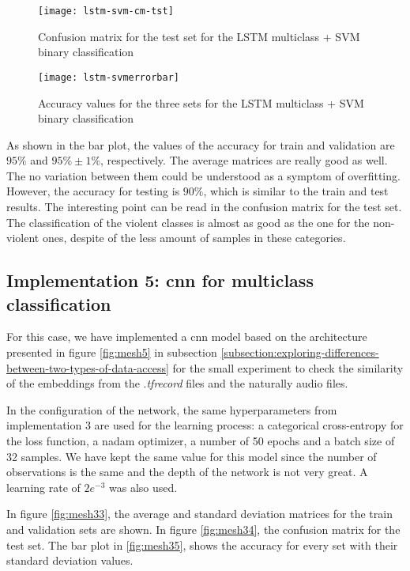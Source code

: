 	\begin{figure}[H]
		\centering
		\captionsetup{justification=centering}
		\texttt{[image: lstm-svm-cm-tst]}
		\caption{Confusion matrix for the test set for the LSTM multiclass + SVM binary classification}
		\label{fig:mesh31}
	\end{figure}
	
	\begin{figure}[H]
		\centering
		\captionsetup{justification=centering}
		\texttt{[image: lstm-svmerrorbar]}
		\caption{Accuracy values for the three sets for the LSTM multiclass + SVM binary classification}
		\label{fig:mesh32}
	\end{figure}

	As shown in the bar plot, the values of the accuracy for train and validation are $95\%$ and $95\% \pm 1\%$, respectively. The average matrices are really good as well. The no variation between them could be understood as a symptom of overfitting. However, the accuracy for testing is $90\%$, which is similar to the train and test results. The interesting point can be read in the confusion matrix for the test set. The classification of the violent classes is almost as good as the one for the non-violent ones, despite of the less amount of samples in these categories. 

	
\subsection{Implementation 5: \acrshort{cnn} for multiclass classification}

	For this case, we have implemented a \acrshort{cnn} model based on the architecture presented in figure \ref{fig:mesh5} in subsection \ref{subsection:exploring-differences-between-two-types-of-data-access} for the small experiment to check the similarity of the embeddings from the .\textit{tfrecord} files and the naturally audio files.
	
	In the configuration of the network, the same hyperparameters from implementation 3 are used for the learning process: a categorical cross-entropy for the loss function, a \acrshort{nadam} optimizer, a number of 50 epochs and a batch size of 32 samples. We have kept the same value for this model since the number of observations is the same and the depth of the network is not very great. A learning rate of $2e^{-3}$ was also used. 
	
	In figure \ref{fig:mesh33}, the average and standard deviation matrices for the train and validation sets are shown. In figure \ref{fig:mesh34}, the confusion matrix for the test set. The bar plot in \ref{fig:mesh35}, shows the accuracy for every set with their standard deviation values.
	
